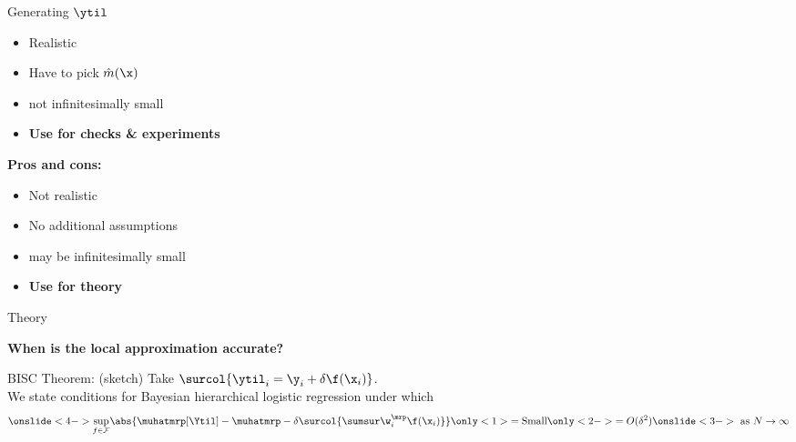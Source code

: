 \begin{frame}[t]{Generating $\ytil$}
{{    \begin{itemize}
    \item Realistic
    \item Have to pick $\hat{m}(\x)$
    \item \surcol{$\Ytil - \Ysur$} not infinitesimally small
    \item \textbf{Use for checks \& experiments}
    \end{itemize}
    }
    {
\textbf{Pros and cons:}
    \begin{itemize}
    \item Not realistic
    \item No additional assumptions
    \item \surcol{$\Ytil - \Ysur$} may be infinitesimally small
    \item \textbf{Use for theory}
    \end{itemize}
    }
}



\end{frame}


\begin{frame}[c]{Theory}

\textbf{When is the local approximation accurate?}

\begin{block}{BISC Theorem: (sketch)}
    Take $\surcol{\ytil_i = \y_i + \delta \f(\x_i)}$.\\[1em]
    We state conditions for Bayesian hierarchical logistic regression under which
$$
\onslide<4->{\sup_{f \in \mathcal{F}}}
\abs{
    \muhatmrp[\Ytil] - \muhatmrp
    - \delta \surcol{\sumsur \w_i^\mrp \f(\x_i)}
}
\only<1>{ = \textrm{Small}}
\only<2->{ = O(\delta^2)}
\onslide<3->{\textrm{ as }N \rightarrow \infty}
$$
\end{block}




\end{frame}
